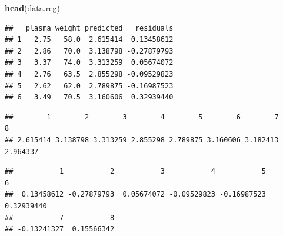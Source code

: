 \documentclass[]{article}
\newenvironment{Shaded}{\begin{snugshade}}{\end{snugshade}}
\newcommand{\CommentTok}[1]{\textcolor[rgb]{0.56,0.35,0.01}{\textit{#1}}}
\newcommand{\DataTypeTok}[1]{\textcolor[rgb]{0.13,0.29,0.53}{#1}}
\newcommand{\KeywordTok}[1]{\textcolor[rgb]{0.13,0.29,0.53}{\textbf{#1}}}
\newcommand{\NormalTok}[1]{#1}
\newcommand{\OperatorTok}[1]{\textcolor[rgb]{0.81,0.36,0.00}{\textbf{#1}}}
\newcommand{\StringTok}[1]{\textcolor[rgb]{0.31,0.60,0.02}{#1}}
\begin{document}
\begin{Shaded}
\begin{Highlighting}[]
\KeywordTok{head}\NormalTok{(data.reg)}
\end{Highlighting}
\end{Shaded}

\begin{verbatim}
##   plasma weight predicted   residuals
## 1   2.75   58.0  2.615414  0.13458612
## 2   2.86   70.0  3.138798 -0.27879793
## 3   3.37   74.0  3.313259  0.05674072
## 4   2.76   63.5  2.855298 -0.09529823
## 5   2.62   62.0  2.789875 -0.16987523
## 6   3.49   70.5  3.160606  0.32939440
\end{verbatim}

\begin{Shaded}
\end{Shaded}

\begin{verbatim}
##        1        2        3        4        5        6        7        8 
## 2.615414 3.138798 3.313259 2.855298 2.789875 3.160606 3.182413 2.964337
\end{verbatim}

\begin{Shaded}
\end{Shaded}

\begin{verbatim}
##           1           2           3           4           5           6 
##  0.13458612 -0.27879793  0.05674072 -0.09529823 -0.16987523  0.32939440 
##           7           8 
## -0.13241327  0.15566342
\end{verbatim}
\end{document}
